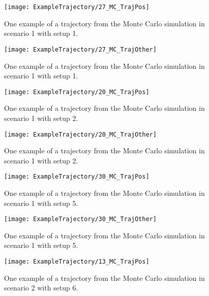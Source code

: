 \begin{figure}[!ht]
	\centering
	\texttt{[image: ExampleTrajectory/27\_MC\_TrajPos]}
	\caption{\label{fig:27montesimstraighttowardsroitrajpos} One example of a trajectory from the Monte Carlo simulation in scenario 1 with setup 1.}
\end{figure}

\begin{figure}[!ht]
	\centering
	\texttt{[image: ExampleTrajectory/27\_MC\_TrajOther]}
	\caption{\label{fig:27montesimstraighttowardsroitrajother} One example of a trajectory from the Monte Carlo simulation in scenario 1 with setup 1.}
\end{figure}

\begin{figure}[!ht]
	\centering
	\texttt{[image: ExampleTrajectory/20\_MC\_TrajPos]}
	\caption{\label{fig:20montesimstraighttowardsroiangveltrajpos} One example of a trajectory from the Monte Carlo simulation in scenario 1 with setup 2.}
\end{figure}

\begin{figure}[!ht]
	\centering
	\texttt{[image: ExampleTrajectory/20\_MC\_TrajOther]}
	\caption{\label{fig:20montesimstraighttowardsroiangveltrajother} One example of a trajectory from the Monte Carlo simulation in scenario 1 with setup 2.}
\end{figure}

\begin{figure}[!ht]
	\centering
	\texttt{[image: ExampleTrajectory/30\_MC\_TrajPos]}
	\caption{\label{fig:30montesimstraighttowardsroiangvelcornertrajpos} One example of a trajectory from the Monte Carlo simulation in scenario 1 with setup 5.}
\end{figure}

\begin{figure}[!ht]
	\centering
	\texttt{[image: ExampleTrajectory/30\_MC\_TrajOther]}
	\caption{\label{fig:30montesimstraighttowardsroiangvelcornertrajother} One example of a trajectory from the Monte Carlo simulation in scenario 1 with setup 5.}
\end{figure}

\begin{figure}[!ht]
	\centering
	\texttt{[image: ExampleTrajectory/13\_MC\_TrajPos]}
	\caption{\label{fig:13trajectorycrossingroipos} One example of a trajectory from the Monte Carlo simulation in scenario 2 with setup 6.}
\end{figure}

